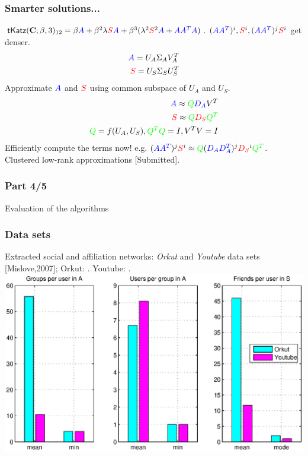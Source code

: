 \documentclass{beamer}
\begin{document}
\begin{frame}
\frametitle{Smarter solutions...}
\begin{itemize}
\pitem $\textsf{tKatz}(\mathbf{C};\beta,3)_{12} = \beta \textcolor{blue}{A} + \beta^2 \lambda \textcolor{red}{S} \textcolor{blue}{A} +  \beta^3(\lambda^2 \textcolor{red}{S}^2 \textcolor{blue}{A} + \textcolor{blue}{A} \textcolor{blue}{A^T} \textcolor{blue}{A})$.
\pitem $(\textcolor{blue}{A}\textcolor{blue}{A^{T}})^i, \textcolor{red}{S}^{i}, (\textcolor{blue}{A}\textcolor{blue}{A^{T}})^{j}\textcolor{red}{S}^{i}$ get denser.
\pause
\begin{align*}
\textcolor{blue}{A} = U_{A} \Sigma_{A} V_{A}^{T}\\
\textcolor{red}{S} = U_{S} \Sigma_{S} U_{S}^{T}
\end{align*}
\pitem Approximate $\textcolor{blue}{A}$ and $\textcolor{red}{S}$ using common subspace of $U_{A}$ and $U_{S}$.
\pause
\begin{align*}
\textcolor{blue}{A} \approx \textcolor{green}{Q} \textcolor{blue}{D_{A}}V^{T} \\
\textcolor{red}{S} \approx \textcolor{green}{Q} \textcolor{red}{D_{S}} \textcolor{green}{Q^{T}}\\
\textcolor{green}{Q} = f(U_{A}, U_{S}), \textcolor{green}{Q^{T}}\textcolor{green}{Q} = I, V^{T}V = I
\end{align*}
\pitem Efficiently compute the terms now! e.g. $(\textcolor{blue}{A}\textcolor{blue}{A^{T}})^j\textcolor{red}{S}^{i} \approx \textcolor{green}{Q}(\textcolor{blue}{D_A}\textcolor{blue}{D_A^{T}})^{j}\textcolor{red}{D_{S}}^{i} \textcolor{green}{Q^T}$.
\pitem Clustered low-rank approximations [Submitted].
\end{itemize}
\end{frame}

\begin{frame}
\frametitle{Part 4/5}
  \hspace{1.1in}
  \centerline{\huge{Evaluation of the algorithms}}
\end{frame}

\begin{frame}
\frametitle{Data sets}
Extracted social and affiliation networks: \emph{Orkut} and \emph{Youtube} data sets [Mislove,2007]; Orkut: . Youtube: .
\includegraphics[scale=0.5]{../talk/figures/stats.eps}
\end{frame}
\end{document}
